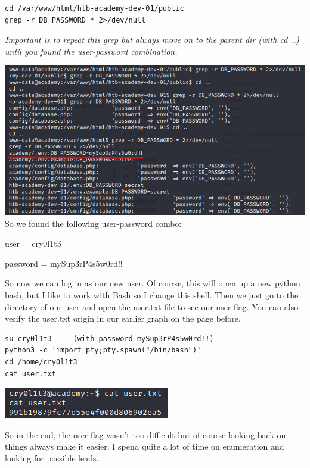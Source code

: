 \documentclass[../main.tex]{subfiles}
\begin{document}
\begin{lstlisting}
cd /var/www/html/htb-academy-dev-01/public
grep -r DB_PASSWORD * 2>/dev/null
\end{lstlisting}

\pagebreak
\emph{Important is to repeat this grep but always move on to the parent dir (with cd ..) until you found the user-password combination.}

\includegraphics[width=\linewidth]{images/Robbe/Academy_user2.png}
So we found the following user-password combo:

\quad user = cry0l1t3

\quad password = mySup3rP4s5w0rd!!

So now we can log in as our new user. Of course, this will open up a new python bash, but I like to work with Bash so I change this shell. Then we just go to the directory of our user and open the user.txt file to see our user flag. You can also verify the user.txt origin in our earlier graph on the page before.
\begin{lstlisting}
su cry0l1t3     (with password mySup3rP4s5w0rd!!)
python3 -c 'import pty;pty.spawn("/bin/bash")'
cd /home/cry0l1t3
cat user.txt
\end{lstlisting}

\begin{center}
\includegraphics[width=0.5\linewidth]{images/Robbe/Academy_user3.png}
\end{center}

So in the end, the user flag wasn't too difficult but of course looking back on things always make it easier. I spend quite a lot of time on enumeration and looking for possible leads.

\pagebreak
\end{document}
